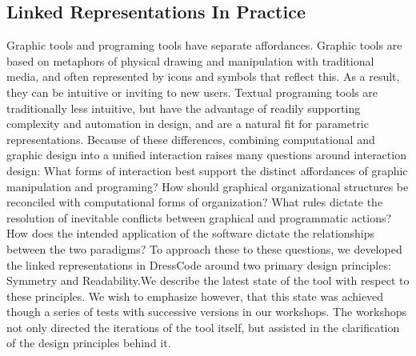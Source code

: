 \documentclass{sigchi}
\begin{document}
\subsection{Linked Representations In Practice}
Graphic tools and programing tools have separate affordances. Graphic tools are based on metaphors of physical drawing and manipulation with traditional media, and often represented by icons and symbols that reflect this. As a result, they can be intuitive or inviting to new users. Textual programing tools are traditionally less intuitive, but have the advantage of readily supporting complexity and automation in design, and are a natural fit for parametric representations. Because of these differences, combining computational and graphic design into a unified interaction raises many questions around interaction design: What forms of interaction best support the distinct affordances of graphic manipulation and programing? How should graphical organizational structures be reconciled with computational forms of organization? What rules dictate the resolution of inevitable conflicts between graphical and programmatic actions? How does the intended application of the software dictate the relationships between the two paradigms? To approach these to these questions, we developed the linked representations in DressCode around two primary design principles: Symmetry and Readability.We describe the latest state of the tool with respect to these principles. We wish to emphasize however, that this state was achieved though a series of tests with successive versions in our workshops. The workshops not only directed the iterations of the tool itself, but assisted in the clarification of the design principles behind it.
\end{document}
